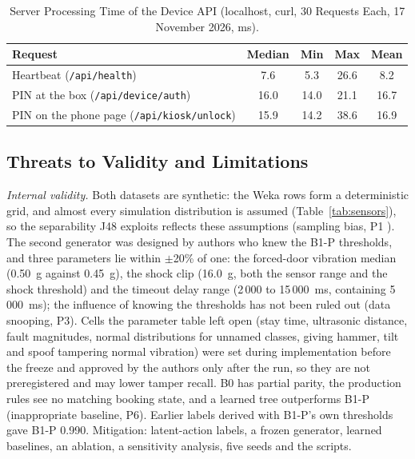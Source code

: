 \documentclass[journal,onecolumn]{IEEEtran}
\begin{document}
\begin{table}[!htbp]
\renewcommand{\arraystretch}{1.02}
\centering
\small
\caption{Server Processing Time of the Device API (localhost, curl, 30 Requests Each, 17 November 2026, ms).}
\label{tab:latency}
\vspace{5pt}
\begin{tabular}{l c c c c}
\hline
Request & Median & Min & Max & Mean \\
\hline
\rule{0pt}{2.6ex}Heartbeat (\texttt{/api/health})                     & 7.6  & 5.3  & 26.6  & 8.2 \\
PIN at the box (\texttt{/api/device/auth})           & 16.0 & 14.0 & 21.1  & 16.7 \\
PIN on the phone page (\texttt{/api/kiosk/unlock})   & 15.9 & 14.2 & 38.6  & 16.9 \\
\hline
\end{tabular}
\end{table}

\subsection{Threats to Validity and Limitations}
\label{sec:limits}

\textit{Internal validity.} Both datasets are synthetic: the Weka rows form a deterministic grid, and almost every
simulation distribution is assumed (Table~\ref{tab:sensors}), so the separability J48 exploits reflects these
assumptions (sampling bias, P1 \cite{arp2022dos}). The second generator was designed by authors who
knew the B1-P thresholds, and three parameters lie within $\pm$20\% of one: the forced-door vibration median (0.50~g
against 0.45~g), the shock clip (16.0~g, both the sensor range and the shock threshold) and the timeout
delay range (2\,000 to 15\,000~ms, containing 5\,000~ms); the influence of knowing the thresholds has not been ruled
out (data snooping, P3). Cells the parameter table left open (stay time, ultrasonic distance, fault magnitudes, normal
distributions for unnamed classes, giving hammer, tilt and spoof tampering normal vibration) were set during
implementation before the freeze and approved by the authors only after the run, so they are not preregistered and may lower tamper recall. B0 has partial parity, the production rules see no matching booking state, and a learned tree outperforms B1-P (inappropriate baseline, P6). Earlier labels
derived with B1-P's own thresholds gave B1-P 0.990. Mitigation: latent-action labels, a frozen
generator, learned baselines, an ablation, a sensitivity analysis, five seeds and the scripts.
\end{document}
